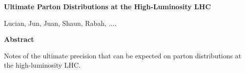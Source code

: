 \documentclass[11pt,a4paper]{article}
\numberwithin{equation}{section}
\numberwithin{figure}{section}
\numberwithin{table}{section}
\begin{document}
\begin{titlepage}
\thispagestyle{empty}
\noindent

\begin{center}
  {\LARGE \bf\boldmath
Ultimate Parton Distributions at the High-Luminosity LHC}
\vspace{1.3cm}


Lucian, Jun, Juan, Shaun, Rabah, ....


\vspace{1.0cm}

{\bf \large Abstract}

\end{center}

Notes of the ultimate precision that can be expected
on parton distributions at the high-luminosity LHC.


\vspace{0.8cm}

\end{titlepage}

\restoregeometry

\tableofcontents





\FloatBarrier

{}
%

\end{document}
